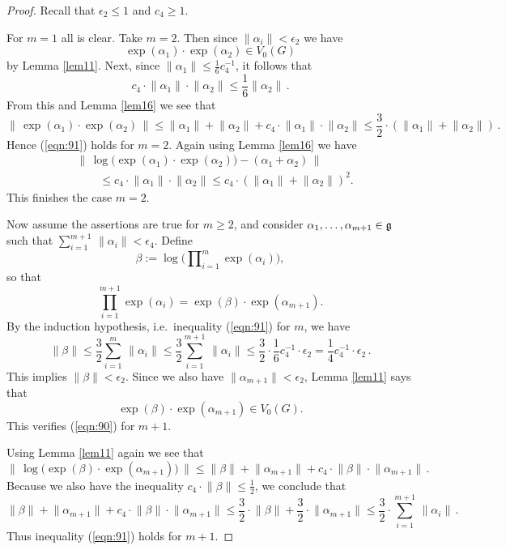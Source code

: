 \documentclass[10pt, a4paper]{amsart}
\theoremstyle{definition}
\numberwithin{equation}{section}
\newcommand{\opn}{\operatorname}
\newcommand{\mfrak}[1]{\mathfrak{#1}}
\newcommand{\smfrac}[2]{{\textstyle \frac{#1}{#2}}}
\newcommand{\norm}[1]{\lVert #1 \rVert}
\newcommand{\Norm}[1]{\bigl\lVert\, #1 \, \bigr\rVert}
\newcommand{\g}{\mfrak{g}}
\newcommand{\lb}{\linebreak}
\begin{document}
\begin{proof}
Recall that $\epsilon_2 \leq 1$ and $c_4 \geq 1$.

For $m = 1$ all is clear. Take $m = 2$. Then since
$\norm{\alpha_i} < \epsilon_2$ we have 
\[ \opn{exp}(\alpha_1) \cdot \opn{exp}(\alpha_2) \in V_0(G) \]
by Lemma \ref{lem11}. Next, since
$\norm{\alpha_1} \leq \smfrac{1}{6} c_4^{-1}$, it follows that
\[ c_4 \cdot \norm{\alpha_1} \cdot \norm{\alpha_2} \leq 
\smfrac{1}{6}  \norm{\alpha_2} \, . \]
{}From this and Lemma \ref{lem16} we see that
\[ \Norm{ \opn{exp}(\alpha_1) \cdot \opn{exp}(\alpha_2) } \leq 
\norm{\alpha_1} + \norm{\alpha_2} + c_4 \cdot \norm{\alpha_1} \cdot
\norm{\alpha_2} 
\leq \smfrac{3}{2} \cdot (\norm{\alpha_1} + \norm{\alpha_2}) \, . \]
Hence (\ref{eqn:91}) holds for $m = 2$.
Again using Lemma \ref{lem16}  we have
\[ \begin{aligned}
& \Norm{ \opn{log} \bigl( \opn{exp}(\alpha_1) \cdot 
\opn{exp}(\alpha_2) \bigr) -  
( \alpha_1 + \alpha_2 ) } \\
& \qquad \leq
c_{4} \cdot \norm{\alpha_1} \cdot \norm{\alpha_2} 
\leq c_{4} \cdot (\norm{\alpha_1} + \norm{\alpha_2})^2 .
\end{aligned}  \]
This finishes the case $m = 2$.

Now assume the assertions are true for $m \geq 2$, and consider 
$\alpha_1, \ldots, \lb \alpha_{m+1} \in \g$ such that
$\sum_{i = 1}^{m+1}\, \norm{\alpha_i} < \epsilon_4$.
Define
\[ \beta := \opn{log} \bigl( \prod\nolimits_{i=1}^{m}
\opn{exp}(\alpha_i) \bigr)  , \]
so that
\[ \prod_{i=1}^{m+1} \opn{exp}(\alpha_i) =
\opn{exp}(\beta) \cdot \opn{exp}(\alpha_{m+1}) . \]
By the induction hypothesis, i.e.\ inequality (\ref{eqn:91}) for $m$,
we have
\begin{equation} \label{eqn:93}
\norm{\beta} \leq \smfrac{3}{2} \sum_{i = 1}^m\, \norm{\alpha_i}
\leq
\smfrac{3}{2} \sum_{i = 1}^{m+1}\, \norm{\alpha_i}
\leq \smfrac{3}{2} \cdot \smfrac{1}{6}  c_4^{-1} \cdot \epsilon_2 =
\smfrac{1}{4} c_4^{-1} \cdot \epsilon_2 \, .
\end{equation}
This implies 
$\norm{\beta} < \epsilon_2$. Since we also have 
$\norm{\alpha_{m+1}} < \epsilon_2$, Lemma  \ref{lem11} says that
\[ \opn{exp}(\beta) \cdot \opn{exp}(\alpha_{m+1}) \in V_0(G) . \]
This verifies (\ref{eqn:90}) for $m+1$.

Using Lemma \ref{lem11} again we see that 
\[ \Norm{ \opn{log} \bigl( \opn{exp}(\beta) \cdot
\opn{exp}(\alpha_{m+1})
\bigr) } \leq 
\norm{\beta} + \norm{\alpha_{m+1}} + 
c_4 \cdot \norm{\beta} \cdot \norm{\alpha_{m+1}} \, . \]
Because we also have the inequality
$c_4 \cdot \norm{\beta} \leq \smfrac{1}{2}$, 
we conclude that
\[ \norm{\beta} + \norm{\alpha_{m+1}} + 
c_4 \cdot \norm{\beta} \cdot \norm{\alpha_{m+1}} \leq
\smfrac{3}{2} \cdot \norm{\beta} + \smfrac{3}{2} \cdot \norm{\alpha_{m+1}} \leq
\smfrac{3}{2} \cdot \sum_{i = 1}^{m+1}\, \norm{\alpha_i} \, . \]
Thus inequality (\ref{eqn:91}) holds for $m+1$.


\end{proof}
\end{document}
